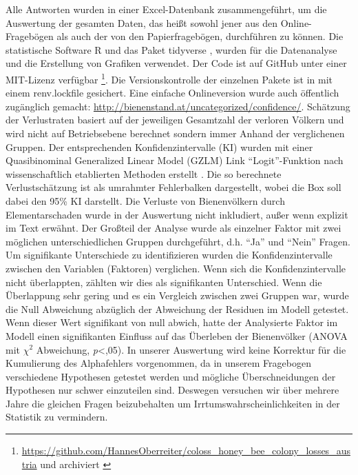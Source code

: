 Alle Antworten wurden in einer Excel-Datenbank zusammengeführt, um die Auswertung der gesamten Daten, das heißt sowohl jener aus den Online-Fragebögen als auch der von den Papierfragebögen, durchführen zu können. Die statistische Software R \citep{rcoreteam2020} und das Paket tidyverse \citep{wickham2019}, wurden für die Datenanalyse und die Erstellung von Grafiken verwendet. Der Code ist auf GitHub unter einer MIT-Lizenz verfügbar \footnote{\url{https://github.com/HannesOberreiter/coloss_honey_bee_colony_losses_austria} und archiviert \cite{HannesOberreiter2019}}. Die Versionskontrolle der einzelnen Pakete ist in mit einem renv.lockfile gesichert. Eine einfache Onlineversion wurde auch öffentlich zugänglich gemacht: \url{http://bienenstand.at/uncategorized/confidence/}.
\newline
Schätzung der Verlustraten basiert auf der jeweiligen Gesamtzahl der verloren Völkern und wird nicht auf Betriebsebene berechnet sondern immer Anhand der verglichenen Gruppen. Der entsprechenden Konfidenzintervalle (KI) wurden mit einer Quasibinominal Generalized Linear Model (GZLM) Link \enquote{Logit}-Funktion nach wissenschaftlich etablierten Methoden erstellt \citep{vanderzee2013}. Die so berechnete Verlustschätzung ist als umrahmter Fehlerbalken dargestellt, wobei die Box soll dabei den 95\% KI darstellt. Die Verluste von Bienenvölkern durch Elementarschaden wurde in der Auswertung nicht inkludiert, außer wenn explizit im Text erwähnt.
\newline
Der Großteil der Analyse wurde als einzelner Faktor mit zwei möglichen unterschiedlichen Gruppen durchgeführt, d.h. \enquote{Ja} und \enquote{Nein} Fragen. Um signifikante Unterschiede zu identifizieren wurden die Konfidenzintervalle zwischen den Variablen (Faktoren) verglichen. Wenn sich die Konfidenzintervalle nicht überlappten, zählten wir dies als signifikanten Unterschied. Wenn die Überlappung sehr gering und es ein Vergleich zwischen zwei Gruppen war, wurde die Null Abweichung abzüglich der Abweichung der Residuen im Modell getestet. Wenn dieser Wert signifikant von null abwich, hatte der Analysierte Faktor im Modell einen signifikanten Einfluss auf das Überleben der Bienenvölker (ANOVA mit $\chi^{2}$ Abweichung, \textit{p}<,05).
\newline
In unserer Auswertung wird keine Korrektur für die Kumulierung des Alphafehlers vorgenommen, da in unserem Fragebogen verschiedene Hypothesen getestet werden und mögliche Überschneidungen der Hypothesen nur schwer einzuteilen sind. Deswegen versuchen wir über mehrere Jahre die gleichen Fragen beizubehalten um Irrtumswahrscheinlichkeiten in der Statistik zu vermindern.
